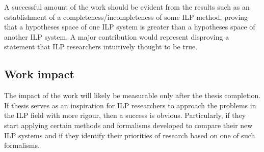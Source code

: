 A successful amount of the work should be evident from the results such as an establishment of a completeness/incompleteness of some ILP method, proving that a hypotheses space of one ILP system is greater than a hypotheses space of another ILP system. A major contribution would represent disproving a statement that ILP researchers intuitively thought to be true.

\subsection{Work impact}
The impact of the work will likely be measurable only after the thesis completion. If thesis serves as an inspiration for ILP researchers to approach the problems in the ILP field with more rigour, then a success is obvious. Particularly, if they start applying certain methods and formalisms developed to compare their new ILP systems and if they identify their priorities of research based on one of such formalisms.

